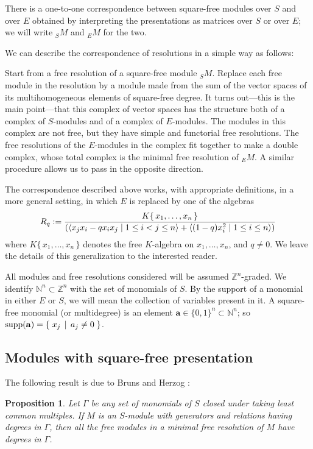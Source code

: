 \documentclass{tran-l}
\newtheorem{proposition}[theorem]{Proposition}
\theoremstyle{definition}
\theoremstyle{remark}
\newcommand{\N}{{\mathbb{N}}}
\newcommand{\NN}{{\mathbb{N}}}
\newcommand{\Z}{{\mathbb{Z}}}
\newcommand{\baa}{{\mathbf{a}}}
\newcommand{\setdef}[2]{{\{\;#1\;\,|\allowbreak  \;\,#2\;\}}}
\newcommand{\supp}{\mathop{\rm supp}\nolimits}
\begin{document}
There is a one-to-one correspondence between square-free modules over $S$ and
over $E$ obtained by interpreting the presentations as matrices over $S$ or
over $E$; we will write $_SM$ and $_EM$ for the two. 

We can describe the correspondence of resolutions in a simple way
as follows:

Start from a free resolution of a square-free module $_SM$. Replace
each free module in the resolution by a module made from the sum of
the vector spaces of its multihomogeneous elements of square-free
degree. It turns out---this is the main point---that this complex
of vector spaces has the structure both of a complex of
$S$-modules and of a complex of $E$-modules. The modules in this
complex are not free, but they have simple and functorial free
resolutions. The free resolutions of the
$E$-modules in the complex fit together to make a double complex,
whose total complex is the minimal free resolution of $_EM$. A
similar procedure allows us to pass in the opposite direction. 

The correspondence described above works,
with appropriate definitions, in a more general setting,
in which $E$ is replaced by one 
of the algebras
\[
R_q:={K\{\,x_1,\ldots , x_n\,\}\over
({\langle 
x_jx_i-qx_ix_j \mid 1\le i<j\le n\rangle
+
\langle (1-q)x_i^2\mid 1\le i\le n\rangle})}
\] 
where $K\{\,x_1,\ldots , x_n\,\}$ denotes the free
 $K$-algebra on
$x_1,\ldots , x_n$, and $q\ne 0$. We leave the details of this
generalization to the interested reader.

All modules and free resolutions considered will
be assumed $\Z^n$-graded. We identify $\N^n\subset\Z^n$ with the set
of monomials of $S$. By the support of a monomial in either $E$ or $S$,
we will mean the collection of variables present in it.
A square-free monomial (or multidegree) is an element
$\baa\in\{0,1\}^n\subset\NN^n$; so $\supp(\baa)=\setdef
{x_j} {a_j\ne 0}$.  

\subsection*{Modules with square-free presentation} The following result is due
to Bruns and Herzog \cite[Theorem 3.1 a)]{BH2}:

\begin{proposition}\label{sfbettis} Let $\Gamma$ be any set of monomials of $S$
closed under taking least common multiples. If $M$ is an $S$-module
with generators and relations having degrees in $\Gamma$, then all the
free modules in a minimal free resolution of $M$ have degrees in
$\Gamma$.\end{proposition}
\end{document}
